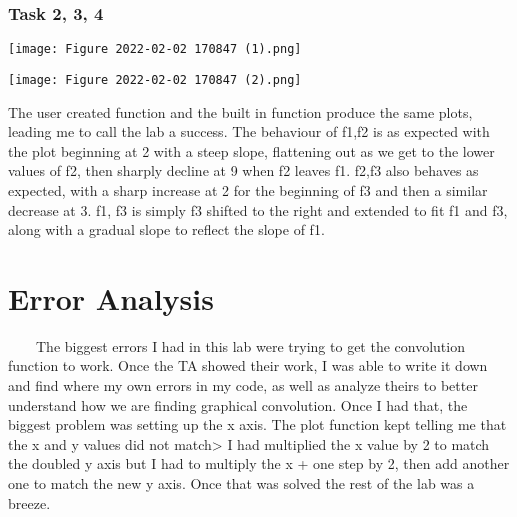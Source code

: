 \documentclass[11pt,a4]{article}
\begin{document}
\subsubsection{Task 2, 3, 4}

\texttt{[image: Figure 2022-02-02 170847 (1).png]}

\texttt{[image: Figure 2022-02-02 170847 (2).png]}

The user created function and the built in function produce the same plots, leading me to call the lab a success. The behaviour of f1,f2 is as expected with the plot beginning at 2 with a steep slope, flattening out as we get to the lower values of f2, then sharply decline at 9 when f2 leaves f1. f2,f3 also behaves as expected, with a sharp increase at 2 for the beginning of f3 and then a similar decrease at 3. f1, f3 is simply f3 shifted to the right and extended to fit f1 and f3, along with a gradual slope to reflect the slope of f1.

\section{Error Analysis}
\ \ \ \ The biggest errors I had in this lab were trying to get the convolution function to work. Once the TA showed their work, I was able to write it down and find where my own errors in my code, as well as analyze theirs to better understand how we are finding graphical convolution. Once I had that, the biggest problem was setting up the x axis. The plot function kept telling me that the x and y values did not match> I had multiplied the x value by 2 to match the doubled y axis but I had to multiply the x + one step by 2, then add another one to match the new y axis. Once that was solved the rest of the lab was a breeze.
\end{document}
